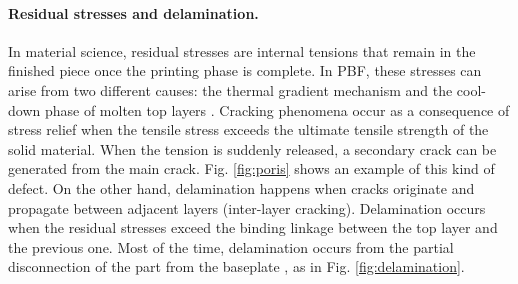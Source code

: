 \paragraph{Residual stresses and delamination.} In material science, residual stresses are internal tensions that remain in the finished piece once the printing phase is complete. In PBF, these stresses can arise from two different causes: the thermal gradient mechanism and the cool-down phase of molten top layers \cite{mercelis_residual_2006}. Cracking phenomena occur as a consequence of stress relief when the tensile stress exceeds the ultimate tensile strength of the solid material. When the tension is suddenly released, a secondary crack can be generated from the main crack. Fig. \ref{fig:poris} shows an example of this kind of defect. On the other hand, delamination happens when cracks originate and propagate between adjacent layers (inter-layer cracking). Delamination occurs when the residual stresses exceed the binding linkage between the top layer and the previous one. Most of the time, delamination occurs from the partial disconnection of the part from the baseplate \cite{sames_metallurgy_2016}, as in Fig. \ref{fig:delamination}.
